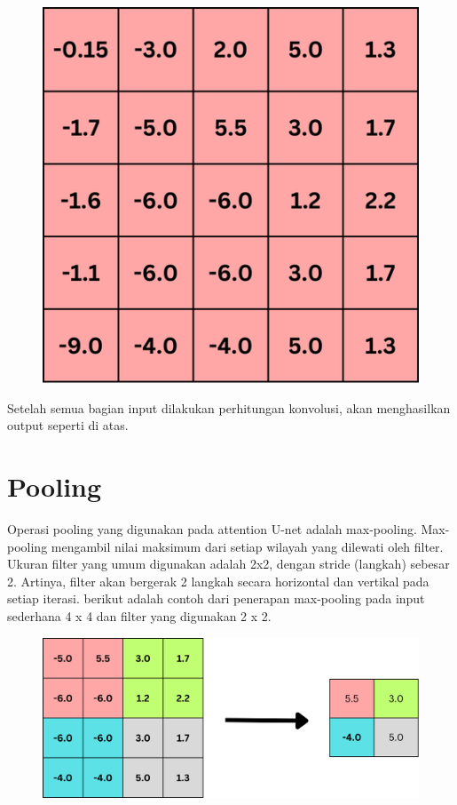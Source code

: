 \begin{figure}[H]
	\centering
	\includegraphics[scale=.3]{gambar/lampiran/hasil-konvolusi.png}
\end{figure}

\noindent Setelah semua bagian input dilakukan perhitungan konvolusi, akan menghasilkan output seperti di atas.

\section{Pooling}


\noindent Operasi pooling yang digunakan pada attention U-net adalah max-pooling. Max-pooling mengambil nilai maksimum dari setiap wilayah yang dilewati oleh filter.  Ukuran filter yang umum digunakan adalah 2x2, dengan stride (langkah) sebesar 2.  Artinya, filter akan bergerak 2 langkah secara horizontal dan vertikal pada setiap iterasi. berikut adalah contoh dari penerapan max-pooling pada input sederhana 4 x 4 dan filter yang digunakan 2 x 2.

\begin{figure}[H]
	\centering
	\includegraphics[scale=.3]{gambar/lampiran/pooling.png}
\end{figure}

